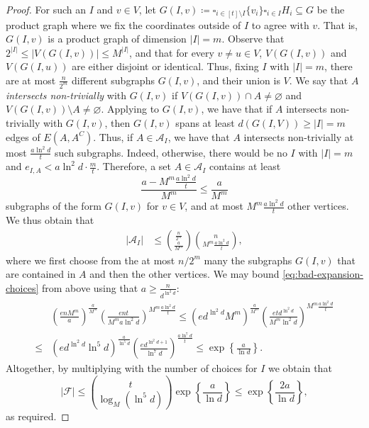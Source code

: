 \documentclass[10pt,a4paper]{article}
\begin{document}
\begin{proof}
For such an $I$ and $v\in V$, let $G(I,v)\coloneqq \square_{i\in [t]\setminus I}\{v_i\} \square_{i\in I}H_i\subseteq G$ be the product graph where we fix the coordinates outside of $I$ to agree with $v$. That is, $G(I, v)$ is a product graph of dimension $|I|=m$. Observe that $2^{|I|}\le|V(G(I,v))|\le M^{|I|}$, and that for every $v\neq u\in V$, $V(G(I,v))$ and $V(G(I,u))$ are either disjoint or identical. Thus, fixing $I$ with $|I|=m$, there are at most $\frac{n}{2^m}$ different subgraphs $G(I,v)$, and their union is $V$. We say that $A$ \textit{intersects non-trivially} with $G(I,v)$ if $V(G(I,v))\cap A\neq \varnothing$ and $V(G(I,v))\setminus A\neq \varnothing$.
Applying  to $G(I, v)$, we have that if $A$ intersects non-trivially with $G(I,v)$, then $G(I,v)$ spans at least $d(G(I, V)) \geq |I|=m$ edges of $E(A,A^C)$. Thus, if $A\in \mathcal{A}_I$, we have that $A$ intersects non-trivially at most $\frac{a\ln^2d}{t}$ such subgraphs. Indeed, otherwise, there would be no $I$ with $|I|=m$ and $e_{I,A}<a\ln^2d\cdot \frac{m}{t}$. Therefore, a set $A\in \mathcal{A}_I$ contains at least $$\frac{a-M^m\frac{a\ln^2d}{t}}{M^m} \leq \frac{a}{M^m}$$ subgraphs of the form $G(I, v)$ for $v \in V$, and at most $M^m\frac{a\ln^2d}{t}$ other vertices. We thus obtain that
\begin{align} \label{eq:bad-expansion-choices}
    |\mathcal{A}_I|&\le \binom{\frac{n}{2^m}}{\frac{a}{M^m}}\binom{n}{M^m\frac{a\ln^2d}{t}},
\end{align}
where we first choose from the at most $n/2^m$ many the subgraphs $G(I, v)$ that are contained in $A$ and then the other vertices.
We may bound \eqref{eq:bad-expansion-choices} from above using that $a \geq \frac{n}{d^{\ln^2 d}}$:
\begin{align*}
    &\left(\frac{enM^m}{a}\right)^{\frac{a}{M^m}}\left(\frac{ent}{M^m a\ln^2d}\right)^{M^m\frac{a\ln^2d}{t}}
    \le \left(ed^{\ln^2d}M^m\right)^{\frac{a}{M^m}}\left(\frac{etd^{\ln^2d}}{M^m\ln^2d}\right)^{M^m\frac{a\ln^2d}{t}}\\
    \le&\left(ed^{\ln^2d}\ln^5 d\right)^{\frac{a}{\ln^5d}}\left(\frac{ed^{\ln^2d+1}}{\ln^7d}\right)^{\frac{a\ln^7d}{t}}
    \le \exp\left\{\frac{a}{\ln d}\right\}.
\end{align*}
Altogether, by multiplying with the number of choices for $I$ we obtain that 
\[
|\mathcal{F}|\le \binom{t}{\log_M(\ln^5d)}\exp\left\{\frac{a}{\ln d}\right\}\le \exp\left\{\frac{2a}{\ln d}\right\},
\]
as required.
\end{proof}
\end{document}
